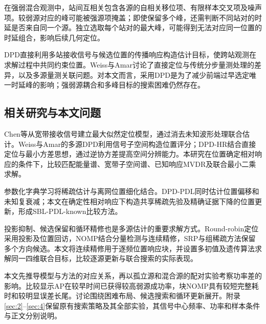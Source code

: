 \documentclass[11pt,a4paper]{article}
\numberwithin{equation}{section}
\numberwithin{figure}{section}
\numberwithin{table}{section}
\begin{document}
在强弱混合观测中，站间互相关包含各源的自相关移位项、有限样本交叉项及噪声项。较弱源对应的峰可能被强源项掩盖；即使保留多个峰，还需判断不同站对的时延是否来自同一个源。独立选取每个站对的最大峰，可能得到无法对应同一位置的时延组合，影响后续几何定位。

DPD直接利用多站接收信号与候选位置的传播响应构造估计目标，使跨站观测在求解过程中共同约束位置。Weiss与Amar讨论了直接定位与传统分步量测处理的差异，以及多源量测关联问题\cite{ref04}。对本文而言，采用DPD是为了减少前端过早选定唯一时延峰的影响；强弱源耦合和多峰目标的搜索困难仍然存在。

\subsection{相关研究与本文问题}\label{sec:1.3}
Chen等从宽带接收信号建立最大似然定位模型，通过消去未知波形处理联合估计\cite{ref05}。Weiss与Amar的多源DPD利用信号子空间构造位置评分\cite{ref04}；DPD-HR结合直接定位与最小方差思想，通过逆协方差提高空间分辨能力\cite{ref06}。本研究在位置确定相对响应的条件下，比较匹配能量谱、宽带子空间谱、已知响应MVDR及联合最小二乘求解。

参数化字典学习将稀疏估计与离网位置细化结合。DPD-PDL同时估计位置偏移和未知复衰减\cite{ref13}；本文在确定性相对响应下构造共享稀疏先验及精确证据下降的位置更新，形成SBL-PDL-known比较方法。

投影抑制、候选保留和循环精修也是多源估计的重要求解方式。Round-robin定位采用投影及位置回访\cite{ref07}，NOMP结合分量检测与连续精修\cite{ref08}，SRP与组稀疏方法保留多个方向候选\cite{ref09}。本文将连续精修用于逐频位置响应块，并设置多初值及遗传算法求解同一四维联合目标，比较逐源更新与联合搜索的实际表现。

本文先推导模型与方法的对应关系，再以孤立源和混合源的配对实验考察功率差的影响。比较显示AP在较早时间已获得较高弱源成功率，块NOMP具有较短完整耗时和较明显误差长尾。讨论围绕困难布局、候选搜索和循环更新展开。附录\ref{sec:2}--\ref{sec:4}保留原有搜索策略及其全部实验，其信号中心频率、功率和样本条件与正文分别说明。



\FloatBarrier
\end{document}
